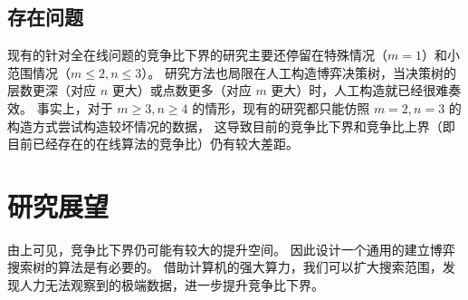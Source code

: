 \subsection{存在问题}

现有的针对全在线问题的竞争比下界的研究主要还停留在特殊情况（$m=1$）和小范围情况（$m\leq 2,n\leq 3$）。
研究方法也局限在人工构造博弈决策树，当决策树的层数更深（对应 $n$ 更大）或点数更多（对应 $m$ 更大）时，人工构造就已经很难奏效。
事实上，对于 $m\geq 3,n\geq 4$ 的情形，现有的研究都只能仿照 $m=2,n=3$ 的构造方式尝试构造较坏情况的数据，
这导致目前的竞争比下界和竞争比上界（即目前已经存在的在线算法的竞争比）仍有较大差距。

\section{研究展望}

由上可见，竞争比下界仍可能有较大的提升空间。
因此设计一个通用的建立博弈搜索树的算法是有必要的。
借助计算机的强大算力，我们可以扩大搜索范围，发现人力无法观察到的极端数据，进一步提升竞争比下界。

\newpage
\begingroup
    \printbibliography[title={参考文献}]
\endgroup